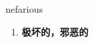 
\begin{frame}
{\huge nefarious}
\begin{center}
\begin{enumerate}\Large
  \item \textbf{极坏的，邪恶的}
\end{enumerate}
\end{center}
\end{frame}
